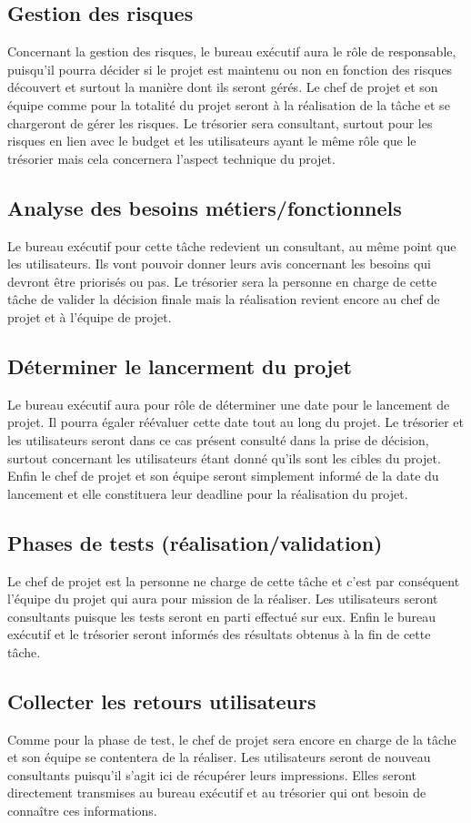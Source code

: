  
\subsection{Gestion des risques}
    Concernant la gestion des risques, le bureau exécutif aura le rôle de responsable, puisqu’il pourra décider si le projet est maintenu ou non en fonction des risques découvert et surtout la manière dont ils seront gérés. Le chef de projet et son équipe comme pour la totalité du projet seront à la réalisation de la tâche et se chargeront de gérer les risques. Le trésorier sera consultant, surtout pour les risques en lien avec le budget et les utilisateurs ayant le même rôle que le trésorier mais cela concernera l’aspect technique du projet. 

 
\subsection{Analyse des besoins métiers/fonctionnels}
    Le bureau exécutif pour cette tâche redevient un consultant, au même point que les utilisateurs. Ils vont pouvoir donner leurs avis concernant les besoins qui devront être priorisés ou pas. Le trésorier sera la personne en charge de cette tâche de valider la décision finale mais la réalisation revient encore au chef de projet et à l’équipe de projet. 

 
\subsection{Déterminer le lancerment du projet}
    Le bureau exécutif aura pour rôle de déterminer une date pour le lancement de projet. Il pourra égaler réévaluer cette date tout au long du projet. Le trésorier et les utilisateurs seront dans ce cas présent consulté dans la prise de décision, surtout concernant les utilisateurs étant donné qu’ils sont les cibles du projet. Enfin le chef de projet et son équipe seront simplement informé de la date du lancement et elle constituera leur deadline pour la réalisation du projet. 

 
\subsection{Phases de tests (réalisation/validation)}
    Le chef de projet est la personne ne charge de cette tâche et c’est par conséquent l’équipe du projet qui aura pour mission de la réaliser. Les utilisateurs seront consultants puisque les tests seront en parti effectué sur eux. Enfin le bureau exécutif et le trésorier seront informés des résultats obtenus à la fin de cette tâche. 

 
\subsection{Collecter les retours utilisateurs}
    Comme pour la phase de test, le chef de projet sera encore en charge de la tâche et son équipe se contentera de la réaliser. Les utilisateurs seront de nouveau consultants puisqu’il s’agit ici de récupérer leurs impressions. Elles seront directement transmises au bureau exécutif et au trésorier qui ont besoin de connaître ces informations. 
